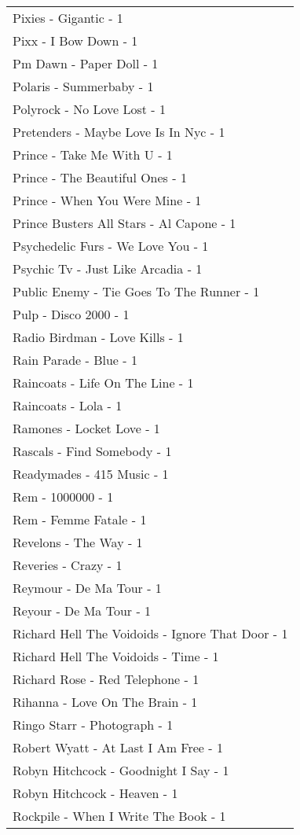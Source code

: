 \documentclass[
]{article}
\begin{document}
\begin{longtable}{l}
Pixies - Gigantic - 1 \\ 
Pixx - I Bow Down - 1 \\ 
Pm Dawn - Paper Doll - 1 \\ 
Polaris - Summerbaby - 1 \\ 
Polyrock - No Love Lost - 1 \\ 
Pretenders - Maybe Love Is In Nyc - 1 \\ 
Prince - Take Me With U - 1 \\ 
Prince - The Beautiful Ones - 1 \\ 
Prince - When You Were Mine - 1 \\ 
Prince Busters All Stars - Al Capone - 1 \\ 
Psychedelic Furs - We Love You - 1 \\ 
Psychic Tv - Just Like Arcadia - 1 \\ 
Public Enemy - Tie Goes To The Runner - 1 \\ 
Pulp - Disco 2000 - 1 \\ 
Radio Birdman - Love Kills - 1 \\ 
Rain Parade - Blue - 1 \\ 
Raincoats - Life On The Line - 1 \\ 
Raincoats - Lola - 1 \\ 
Ramones - Locket Love - 1 \\ 
Rascals - Find Somebody - 1 \\ 
Readymades - 415 Music - 1 \\ 
Rem - 1000000 - 1 \\ 
Rem - Femme Fatale - 1 \\ 
Revelons - The Way - 1 \\ 
Reveries - Crazy - 1 \\ 
Reymour - De Ma Tour - 1 \\ 
Reyour - De Ma Tour - 1 \\ 
Richard Hell The Voidoids - Ignore That Door - 1 \\ 
Richard Hell The Voidoids - Time - 1 \\ 
Richard Rose - Red Telephone - 1 \\ 
Rihanna - Love On The Brain - 1 \\ 
Ringo Starr - Photograph - 1 \\ 
Robert Wyatt - At Last I Am Free - 1 \\ 
Robyn Hitchcock - Goodnight I Say - 1 \\ 
Robyn Hitchcock - Heaven - 1 \\ 
Rockpile - When I Write The Book - 1 \\ 

\end{longtable}
\end{document}
